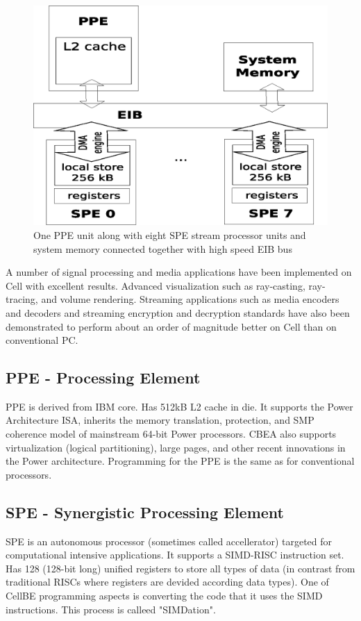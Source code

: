 \begin{figure}
    \centering
    \includegraphics[width=\textwidth]{data/cellLayout}
    \caption[CellBE processor layout]{One PPE unit along with eight SPE stream processor units and system memory connected together with high speed EIB bus}
    \label{fg:processorLayout}
\end{figure}

A number of signal processing and media applications have been implemented on Cell with excellent results. Advanced visualization such as ray-casting, ray-tracing, and volume rendering. Streaming applications such as media encoders and decoders and streaming encryption and decryption standards have also been demonstrated to perform about an order of magnitude better on Cell than on conventional PC.

\subsection{PPE -  Processing Element}
PPE is derived from IBM  core. Has 512kB
L2 cache in die. It supports the Power Architecture ISA, inherits the memory
translation, protection, and SMP coherence model of mainstream 64-bit Power
processors. CBEA also supports virtualization (logical partitioning), large
pages, and other recent innovations in the Power architecture. Programming for
the PPE is the same as for conventional processors.

\subsection{SPE - Synergistic Processing Element}
SPE is an autonomous processor (sometimes called accellerator) targeted for computational intensive applications. It supports a SIMD-RISC instruction set. Has 128 (128-bit long) unified registers to store all types of data (in contrast from traditional RISCs where registers are devided according data types). One of CellBE programming aspects is converting the code that it uses the SIMD instructions. This process is calleed "SIMDation".

